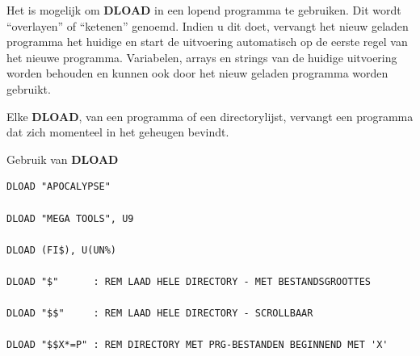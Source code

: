 \begin{description}[leftmargin=2cm,style=nextline]
                  Het is mogelijk om {\bf DLOAD} in een lopend programma te gebruiken. Dit wordt ``overlayen'' of ``ketenen'' genoemd. Indien u dit doet, vervangt het nieuw geladen programma het huidige en start de uitvoering automatisch op de eerste regel van het nieuwe programma. Variabelen, arrays en strings van de huidige uitvoering worden behouden en kunnen ook door het nieuw geladen programma worden gebruikt.

                  Elke {\bf DLOAD}, van een programma of een directorylijst, vervangt een programma dat zich momenteel in het geheugen bevindt.

\item [Voorbeelden:] Gebruik van {\bf DLOAD}

\begin{tcolorbox}[colback=black,coltext=white]
\verbatimfont{\codefont}
\begin{verbatim}
DLOAD "APOCALYPSE"

DLOAD "MEGA TOOLS", U9

DLOAD (FI$), U(UN%)

DLOAD "$"      : REM LAAD HELE DIRECTORY - MET BESTANDSGROOTTES

DLOAD "$$"     : REM LAAD HELE DIRECTORY - SCROLLBAAR

DLOAD "$$X*=P" : REM DIRECTORY MET PRG-BESTANDEN BEGINNEND MET 'X'
\end{verbatim}
\end{tcolorbox}
\end{description}


\newpage
